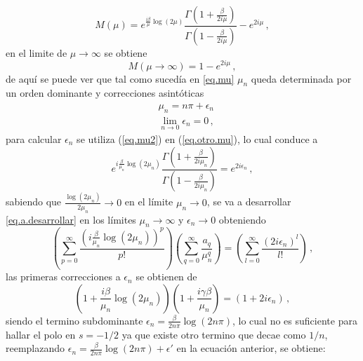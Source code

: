 \begin{equation}
M (\mu) = e ^{\frac{i \beta }{\mu} \log(2 \mu) }
\frac{\Gamma (1 + \frac{ \beta}{2 i \mu})}{\Gamma (1 - \frac{ \beta}{2 i \mu})}
- e ^{2 i \mu}
\, ,
\label{eq.otro.mu}
\end{equation}
en el limite de $\mu  \rightarrow \infty$ se obtiene
\begin{equation}
    M(\mu  \rightarrow \infty) = 
	1 - e ^{2 i \mu}
		\, ,
\end{equation}
de aquí se puede ver que tal como sucedía en \ref{eq.mu} $\mu _n$ queda determinada por un orden dominante y correcciones asintóticas
\begin{equation}
\begin{aligned}
    &\mu _n = n \pi + \epsilon _n \\[5pt]
	&\lim \limits _{n \rightarrow{0}} \epsilon _n  = 0
		\, ,
\end{aligned}
\label{eq.mu2}
\end{equation}
para calcular $\epsilon _n$ se utiliza (\ref{eq.mu2}) en (\ref{eq.otro.mu}), lo cual conduce a
\begin{equation}
	e ^{ i \frac{\beta}{ \mu _n} \log (2 \mu _n)}     
    \frac{\Gamma(1 + \frac{ \beta}{2  i \mu _n} ) }
    {\Gamma(1 -  \frac{ \beta}{2  i \mu _n} )} =    
    e ^{2 i \epsilon _n }
    	\, ,
\label{eq.a.desarrollar}
\end{equation}
sabiendo que $\frac{\log (2 \mu _n)}{2 \mu _n } \rightarrow 0$ en el límite $\mu _n \rightarrow 0$, se va a desarrollar \ref{eq.a.desarrollar} en los límites $ \mu _n \rightarrow \infty $ y $\epsilon _n \rightarrow 0$ obteniendo
\begin{equation}
    \left(
    \sum _{p = 0} ^{\infty} \frac{ \left( i \frac{\beta}{ \mu _n } \log(2 \mu _n ) \right) ^p }{p!}
    \right)
    \left(
	\sum _{q = 0} ^{\infty} \frac{a _q}{\mu _n ^q}
	\right)
    =
    \left(
    \sum _{l = 0} ^{\infty} \frac{( 2 i \epsilon _n)^l}{l !}
    \right)
    	\, ,
\end{equation}
las primeras correcciones a $\epsilon _n$ se obtienen de
\begin{equation}
\left( 1 + \frac{i \beta}{ \mu _n} \log ( 2 \mu _n) \right) 
\left(1 + \frac{i  \gamma \beta}{ \mu _n} \right)  =
(1 + 2 i \epsilon _n) \, ,
\end{equation}
siendo el termino subdominante $\epsilon _n =  \frac{\beta }{2 n \pi}  \log (2 n \pi)$, lo cual no es suficiente para hallar el polo en $s=-1/2$ ya que existe otro termino que decae como $1/n$, reemplazando $\epsilon _n =  \frac{\beta }{2 n \pi} \log (2 n \pi) + \epsilon '$ en la ecuación anterior, se obtiene:
